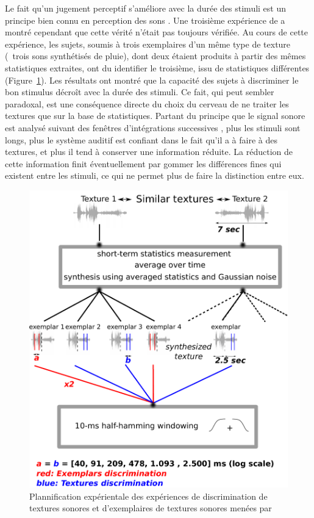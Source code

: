 Le fait qu'un jugement perceptif s'améliore avec la durée des stimuli est un principe bien connu en perception des sons \citep{moore1973frequency}. Une troisième expérience de \citep{mcdermott2013summary} a montré cependant que cette vérité n'était pas toujours vérifiée. Au cours de cette expérience, les sujets, soumis à trois exemplaires d'un même type de texture (\eg~trois sons synthétisés de pluie), dont deux étaient produits à partir des mêmes statistiques extraites, ont du identifier le troisième, issu de statistiques différentes (Figure~\ref{fig:textureMcder}). Les résultats ont montré que la capacité des sujets à discriminer le bon stimulus décroît avec la durée des stimuli. Ce fait, qui peut sembler paradoxal, est une conséquence directe du choix du cerveau de ne traiter les textures que sur la base de statistiques. Partant du principe que le signal sonore est analysé suivant des fenêtres d'intégrations successives \citep{yabe1998temporal,poeppel2003analysis}, plus les stimuli sont longs, plus le système auditif est confiant dans le fait qu'il a à faire à des textures, et plus il tend à conserver une information réduite. La réduction de cette information finit éventuellement par gommer les différences fines qui existent entre les stimuli, ce qui ne permet plus de faire la distinction entre eux.


\begin{figure}[t]
        \myfloatalign
        \includegraphics[width=.8\linewidth]{gfx/mcder}
        \caption[Plannification expérimentale de l'expérience de discrimination de textures sonores et d'exemplaires de textures sonores]{Plannification expérientale des expériences de discrimination de textures sonores et d'exemplaires de textures sonores menées par \citep{mcdermott2013summary}}\label{fig:textureMcder}
\end{figure}

